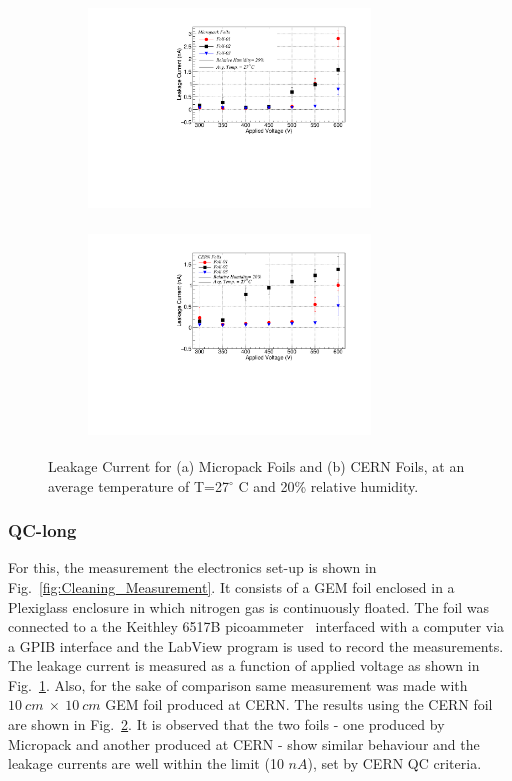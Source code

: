\begin{figure}[!htbp]
    \centering
    \begin{subfigure}[b]{0.5\textwidth}
        \includegraphics[width=7.5cm, height=5.5cm]{figures/GEM/figures/Fig_11(a).pdf}
        \caption{ }
        \label{fig:Indian_foils_H20}
    \end{subfigure}
    \begin{subfigure}[b]{0.46\textwidth}
        \includegraphics[width=7.5cm, height=5.5cm]{figures/GEM/figures/Fig_11(b).pdf} 
        \caption{ }
        \label{fig:CERN_foils}
    \end{subfigure}
   \caption{Leakage Current for (a) Micropack Foils and (b) CERN Foils, at an average temperature of T=27$^{\circ}$ C and 20\% relative humidity.} \label{fig:L_01}
\end{figure}

\subsubsection{QC-long} %
\label{ssub:qc_long}
For this, the measurement the electronics set-up is shown in Fig.~\ref{fig:Cleaning_Measurement}.
It consists of a GEM foil enclosed in a Plexiglass enclosure in which nitrogen gas is continuously floated.
The foil was connected to a the Keithley 6517B picoammeter~\cite{Keithley-6517B-picoammeter} interfaced with a computer via a GPIB interface and the LabView program is used to record the measurements.
The leakage current is measured as a function of applied voltage as shown in Fig.~\ref{fig:Indian_foils_H20}.
Also, for the sake of comparison same measurement was made with $10~cm~\times~10~cm$ GEM foil produced at CERN.
The results using the CERN foil are shown in Fig.~\ref{fig:CERN_foils}.
It is observed that the two foils - one produced by Micropack and another produced at CERN - show similar behaviour and the leakage currents are well within the limit (10 $nA$), set by CERN QC criteria.

